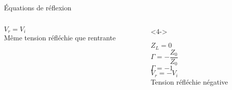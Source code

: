 \begin{frame}{Équations de réflexion}
\begin{columns}
\begin{column}{0.33\textwidth}
\begin{center}
                $V_r = V_i$\\
                \vspace{5pt}
                Même tension réfléchie que rentrante
            \end{center}
        \end{column}
        \begin{column}{0.33\textwidth}<4->
            \begin{center}
                $Z_L = 0$\\
                \vspace{10pt}
                $\Gamma = -\dfrac{Z_0}{Z_0}$\\
                \vspace{10pt}
                $\Gamma = -1$\\
                \vspace{5pt}
                $V_r = -V_i$\\
                \vspace{5pt}
                Tension réfléchie négative
            \end{center}
        \end{column}
    \end{columns}
\end{frame}

